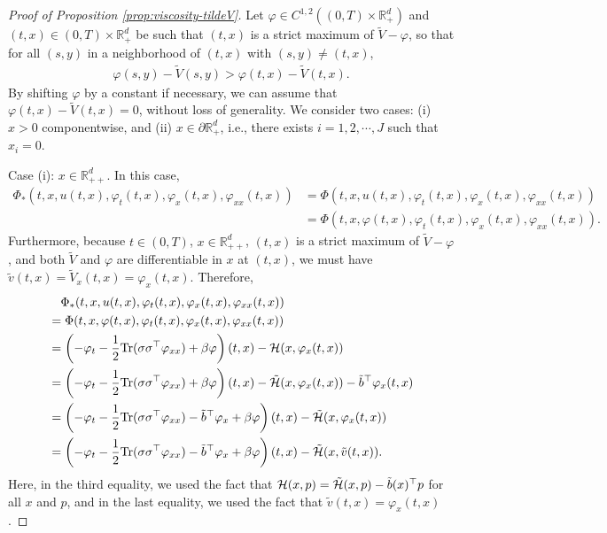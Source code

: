 \documentclass[11pt]{article}
\theoremstyle{definition}
\theoremstyle{plain}
\newcommand{\R}{\mathbb{R}}
\newcommand{\cH}{{\cal H}}
\newcommand{\tb}{\tilde{b}}
\begin{document}
\begin{proof}[Proof of Proposition \ref{prop:viscosity-tildeV}]
Let $\varphi \in C^{1,2}\left((0,T)\times \R_+^d\right)$ and $(t,x) \in (0,T) \times \mathbb{R}_+^d$ be such that $(t,x)$ is a strict maximum of $\tilde{V} - \varphi$, 
so that for all $(s,y)$ in a neighborhood of $(t,x)$ with $(s,y) \neq (t,x)$,
\begin{align}
\varphi(s,y) - \tilde{V}(s,y) > \varphi(t,x) - \tilde{V}(t,x).
\end{align}
By shifting $\varphi$ by a constant if necessary, we can assume that $\varphi(t,x) - \tilde{V}(t,x) = 0$, without loss of generality. 
We consider two cases: (i) $x > 0$ componentwise, and (ii) $x \in \partial \R_+^d$, i.e., there exists $i =1,2, \cdots, J$ such that $x_i = 0$. 

Case (i): $x \in \R_{++}^d$. In this case, 
\begin{align*}
\Phi_*(t,x,u(t,x), \varphi_t(t,x), \varphi_x(t,x), \varphi_{xx}(t,x)) & = \Phi(t,x,u(t,x), \varphi_t(t,x), \varphi_x(t,x), \varphi_{xx}(t,x)) \\
& = \Phi(t,x,\varphi(t,x), \varphi_t(t,x), \varphi_x(t,x), \varphi_{xx}(t,x)).
\end{align*}
Furthermore, because $t \in (0,T)$, $x\in\R_{++}^d$, $(t,x)$ is a strict maximum of $\tilde V-\varphi$, and both $\tilde V$ and $\varphi$ 
are differentiable in $x$ at $(t,x)$, we must have
\(
\tilde v (t,x) = \tilde V_x (t,x) = \varphi_x(t,x).
\)
Therefore, 
\begin{align}
& \quad \Phi_*(t,x,u(t,x), \varphi_t(t,x), \varphi_x(t,x), \varphi_{xx}(t,x)) \\
& = \Phi(t,x,\varphi(t,x), \varphi_t(t,x), \varphi_x(t,x), \varphi_{xx}(t,x)) \\
& = \left(-\varphi_t - \frac{1}{2} \mathrm{Tr}(\sigma \sigma^{\top} \varphi_{xx}) + \beta \varphi \right)(t,x) - \cH (x, \varphi_x (t,x)) \\
& = \left(-\varphi_t - \frac{1}{2} \mathrm{Tr}(\sigma \sigma^{\top} \varphi_{xx}) + \beta \varphi \right)(t,x) - \tilde \cH (x, \varphi_x (t,x)) - \tb^{\top}\varphi_x(t,x) \\
& = \left(-\varphi_t - \frac{1}{2} \mathrm{Tr}(\sigma \sigma^{\top} \varphi_{xx}) -\tb^{\top}\varphi_x + \beta \varphi \right)(t,x) - \tilde \cH (x, \varphi_x (t,x)) \\
& = \left(-\varphi_t - \frac{1}{2} \mathrm{Tr}(\sigma \sigma^{\top} \varphi_{xx}) -\tb^{\top}\varphi_x + \beta \varphi \right)(t,x) - \tilde \cH (x, \tilde v (t,x)).
\end{align}
Here, in the third equality, we used the fact that $\cH (x, p) = \tilde \cH (x, p) - \tb(x)^{\top} p$ for all $x$ and $p$, 
and in the last equality, we used the fact that $\tilde v (t,x) = \varphi_x(t,x)$.


\end{proof}
\end{document}
